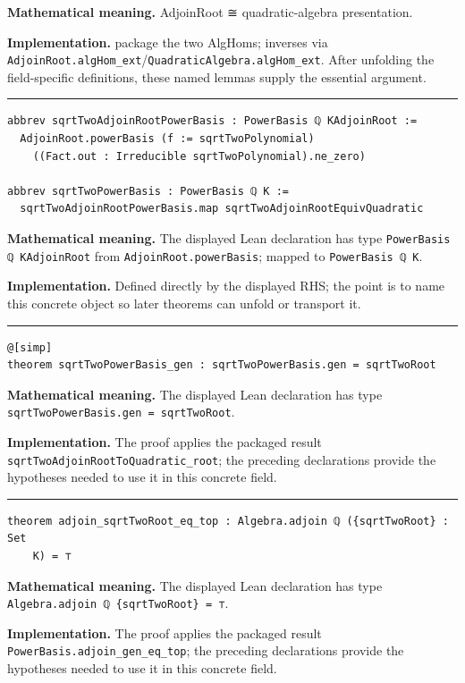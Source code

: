 \documentclass[UTF8,a4paper,11pt,fontset=fandol]{ctexart}
\theoremstyle{definition}
\newcommand{\statementsep}{\par\medskip\hrule\medskip}
\begin{document}
\noindent\textbf{Mathematical meaning.} AdjoinRoot ≅ quadratic-algebra presentation.\par
\noindent\textbf{Implementation.} package the two AlgHoms; inverses via \texttt{AdjoinRoot.\allowbreak{}algHom\_\allowbreak{}ext}/\texttt{QuadraticAlgebra.\allowbreak{}algHom\_\allowbreak{}ext}. After unfolding the field-specific definitions, these named lemmas supply the essential argument.\par
\statementsep
\begin{verbatim}
abbrev sqrtTwoAdjoinRootPowerBasis : PowerBasis ℚ KAdjoinRoot :=
  AdjoinRoot.powerBasis (f := sqrtTwoPolynomial)
    ((Fact.out : Irreducible sqrtTwoPolynomial).ne_zero)

abbrev sqrtTwoPowerBasis : PowerBasis ℚ K :=
  sqrtTwoAdjoinRootPowerBasis.map sqrtTwoAdjoinRootEquivQuadratic
\end{verbatim}
\noindent\textbf{Mathematical meaning.} The displayed Lean declaration has type \texttt{PowerBasis ℚ KAdjoinRoot} from \texttt{AdjoinRoot.\allowbreak{}powerBasis}; mapped to \texttt{PowerBasis ℚ K}.\par
\noindent\textbf{Implementation.} Defined directly by the displayed RHS; the point is to name this concrete object so later theorems can unfold or transport it.\par
\statementsep
\begin{verbatim}
@[simp]
theorem sqrtTwoPowerBasis_gen : sqrtTwoPowerBasis.gen = sqrtTwoRoot
\end{verbatim}
\noindent\textbf{Mathematical meaning.} The displayed Lean declaration has type \texttt{sqrtTwoPowerBasis.\allowbreak{}gen = sqrtTwoRoot}.\par
\noindent\textbf{Implementation.} The proof applies the packaged result \texttt{sqrtTwoAdjoinRootToQuadratic\_\allowbreak{}root}; the preceding declarations provide the hypotheses needed to use it in this concrete field.\par
\statementsep
\begin{verbatim}
theorem adjoin_sqrtTwoRoot_eq_top : Algebra.adjoin ℚ ({sqrtTwoRoot} : Set
    K) = ⊤
\end{verbatim}
\noindent\textbf{Mathematical meaning.} The displayed Lean declaration has type \texttt{Algebra.\allowbreak{}adjoin ℚ \{sqrtTwoRoot\} = ⊤}.\par
\noindent\textbf{Implementation.} The proof applies the packaged result \texttt{PowerBasis.\allowbreak{}adjoin\_\allowbreak{}gen\_\allowbreak{}eq\_\allowbreak{}top}; the preceding declarations provide the hypotheses needed to use it in this concrete field.\par
\end{document}
